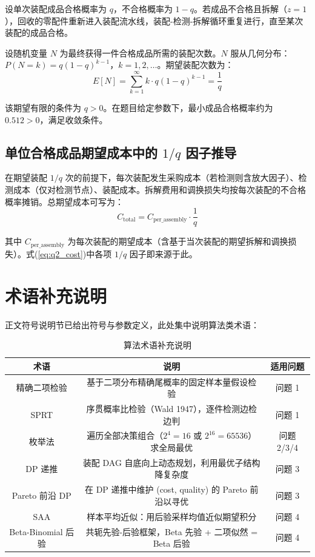 \documentclass[12pt,a4paper]{ctexart}
\begin{document}
设单次装配成品合格概率为 $q$，不合格概率为 $1-q$。若成品不合格且拆解（$z=1$），回收的零配件重新进入装配流水线，装配-检测-拆解循环重复进行，直至某次装配的成品合格。

设随机变量 $N$ 为最终获得一件合格成品所需的装配次数。$N$ 服从几何分布：$P(N=k) = q(1-q)^{k-1}$，$k=1,2,\dots$。期望装配次数为：
\begin{equation}
E[N] = \sum_{k=1}^{\infty} k \cdot q(1-q)^{k-1} = \frac{1}{q}
\end{equation}

该期望有限的条件为 $q>0$。在题目给定参数下，最小成品合格概率约为 $0.512>0$，满足收敛条件。

\subsection{单位合格成品期望成本中的 $1/q$ 因子推导}

在期望装配 $1/q$ 次的前提下，每次装配发生采购成本（若检测则含放大因子）、检测成本（仅对检测节点）、装配成本。拆解费用和调换损失均按每次装配的不合格概率摊销。总期望成本可写为：
\begin{equation}
C_{\text{total}} = C_{\text{per\_assembly}} \cdot \frac{1}{q}
\end{equation}

其中 $C_{\text{per\_assembly}}$ 为每次装配的期望成本（含基于当次装配的期望拆解和调换损失）。式(\ref{eq:q2_cost})中各项 $1/q$ 因子即来源于此。

\section{术语补充说明}

正文符号说明节已给出符号与参数定义，此处集中说明算法类术语：

\begin{table}[H]
\centering
\caption{算法术语补充说明}
\label{tab:symbols_algo}
\begin{tabular}{ccc}
\toprule
术语 & 说明 & 适用问题 \\
\midrule
精确二项检验 & 基于二项分布精确尾概率的固定样本量假设检验 & 问题 1 \\
SPRT & 序贯概率比检验（Wald 1947），逐件检测边检边判 & 问题 1 \\
枚举法 & 遍历全部决策组合（$2^4=16$ 或 $2^{16}=65536$）求全局最优 & 问题 2/3/4 \\
DP 递推 & 装配 DAG 自底向上动态规划，利用最优子结构降复杂度 & 问题 3 \\
Pareto 前沿 DP & 在 DP 递推中维护 (cost, quality) 的 Pareto 前沿以寻优 & 问题 3 \\
SAA & 样本平均近似：用后验采样均值近似期望积分 & 问题 4 \\
Beta-Binomial 后验 & 共轭先验-后验框架，Beta 先验 + 二项似然 = Beta 后验 & 问题 4 \\
\bottomrule
\end{tabular}
\end{table}
\end{document}
